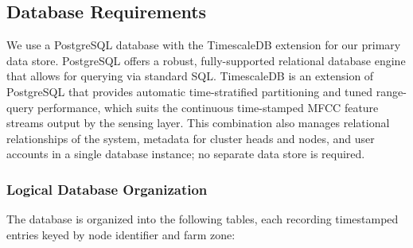 \documentclass[12pt,a4paper,oneside]{memoir}
\begin{document}
\subsection*{Database Requirements}
 
We use a PostgreSQL database with the TimescaleDB extension for our primary data store. PostgreSQL offers a robust, fully-supported relational database engine that allows for querying via standard SQL. TimescaleDB is an extension of PostgreSQL that provides automatic time-stratified partitioning and tuned range-query performance, which suits the continuous time-stamped MFCC feature streams output by the sensing layer. This combination also manages relational relationships of the system, metadata for cluster heads and nodes, and user accounts in a single database instance; no separate data store is required.
 
\subsubsection*{Logical Database Organization}
 
The database is organized into the following tables, each recording timestamped entries keyed by node identifier and farm zone:
 
\end{document}
